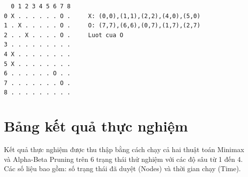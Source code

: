 \documentclass[12pt,a4paper]{article}
\begin{document}
\begin{verbatim}
  0 1 2 3 4 5 6 7 8
0 X . . . . . . O .     X: (0,0),(1,1),(2,2),(4,0),(5,0)
1 . X . . . . . O .     O: (7,7),(6,6),(0,7),(1,7),(2,7)
2 . . X . . . . O .     Luot cua O
3 . . . . . . . . .
4 X . . . . . . . .
5 X . . . . . . . .
6 . . . . . . O . .
7 . . . . . . . O .
8 . . . . . . . . .
\end{verbatim}

\section{Bảng kết quả thực nghiệm}

Kết quả thực nghiệm được thu thập bằng cách chạy cả hai thuật toán Minimax và Alpha-Beta Pruning trên 6 trạng thái thử nghiệm với các độ sâu từ 1 đến 4. Các số liệu bao gồm: số trạng thái đã duyệt (Nodes) và thời gian chạy (Time).

\begin{table}[H]
\centering
\caption{Kết quả thực nghiệm -- State 1 (Bàn cờ trống, lượt X)}
\end{table}
\end{document}
